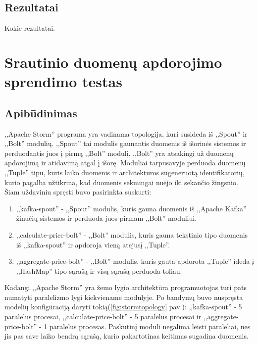\documentclass{VUMIFPSkursinis}
\begin{document}
\subsection{Rezultatai}

Kokie rezultatai.

\section{Srautinio duomenų apdorojimo sprendimo testas}

\subsection{Apibūdinimas}

,,Apache Storm'' programa yra vadinama topologija, kuri susideda iš ,,Spout'' ir ,,Bolt'' modulių. ,,Spout'' tai modulis gaunantis duomenis
iš išorinės sistemos ir perduodantis juos į pirmą ,,Bolt'' modulį. ,,Bolt'' yra atsakingi už duomenų apdorojimą ir atidavimą atgal į išorę.
Moduliai tarpusavyje perduoda duomenų ,,Tuple'' tipu, kuris laiko duomenis ir architektūros sugeneruotą identifikatorių, 
kurio pagalba užtikrina, kad duomenis sėkmingai nuėjo iki sekančio žingsnio. 
Šiam uždaviniu spręsti buvo pasirinkta suskurti:
\begin{enumerate}
    \item ,,kafka-spout'' - ,,Spout'' modulis, kuris gauna duomenis iš ,,Apache Kafka'' žinučių sistemos ir perduoda juos pirmam ,,Bolt'' moduliui.
    \item ,,calculate-price-bolt'' - ,,Bolt'' modulis, kuris gauna tekstinio tipo duomenis iš ,,kafka-spout'' ir apdoroja vieną atejusį ,,Tuple''.
    \item ,,aggregate-price-bolt'' - ,,Bolt'' modulis, kuris gauta apdorota ,,Tuple'' įdeda į ,,HashMap'' tipo sąrašą ir visą sąrašą perduoda toliau.  
\end{enumerate}\par
Kadangi ,,Apache Storm'' yra žemo lygio architektūra programuotojas turi pats numatyti paralelizmo lygi kiekviename modulyje. 
Po bandymų buvo nuspręsta modelių konfigūraciją daryti tokią(\ref{fig:stormtopology} pav.): ,,kafka-spout'' - 5 paralelus procesai, ,,calculate-price-bolt''
 - 5 paralelus procesai ir ,,aggregate-price-bolt'' - 1 paralelus procesas. Paskutinį moduli negalima leisti paraleliai, nes jis pas save 
 laiko bendrą sąrašą, kurio pakartotinas keitimas sugadina duomenis.\par
\end{document}
